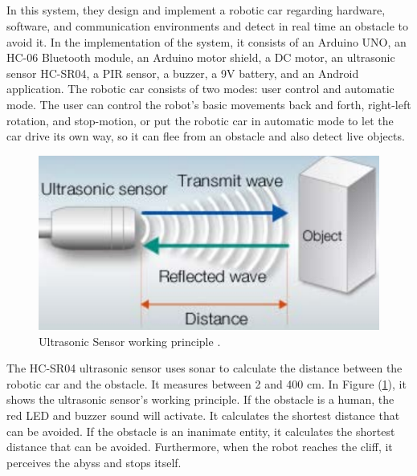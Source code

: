 \documentclass[12pt,a4paper]{report}
\begin{document}
\subsection{\fontsize{12}{12}\selectfont{Remote and Autonomous Controlled Robotic Carbased on Arduino with Real Time Obstacle Detection and Avoidance}}
In this system, they design and implement a robotic car regarding hardware, software, and communication environments and detect in real time an obstacle to avoid it. In the implementation of the system, it consists of an Arduino UNO, an HC-06 Bluetooth module, an Arduino motor shield, a DC motor, an ultrasonic sensor HC-SR04, a PIR sensor, a buzzer, a 9V battery, and an Android application. The robotic car consists of two modes: user control and automatic mode. The user can control the robot's basic movements back and forth, right-left rotation, and stop-motion, or put the robotic car in automatic mode to let the car drive its own way, so it can flee from an obstacle and also detect live objects.
\\
\begin{figure}[H]
    \centering
    \graphicspath{ {./images/} }
    \includegraphics[width=1\textwidth]{Ultrasonic Sensor working principle.png}
    \caption{Ultrasonic Sensor working principle \cite{Robotic}.}
    \label{fig:Ultrasonic Sensor working principle}
    
\end{figure}
The HC-SR04 ultrasonic sensor uses sonar to calculate the distance between the robotic car and the obstacle. It measures between 2 and 400 cm. In Figure (\ref{fig:Ultrasonic Sensor working principle}), it shows the ultrasonic sensor's working principle. If the obstacle is a human, the red LED and buzzer sound will activate. It calculates the shortest distance that can be avoided. If the obstacle is an inanimate entity, it calculates the shortest distance that can be avoided. Furthermore, when the robot reaches the cliff, it perceives the abyss and stops itself\cite{Robotic}. 
\\
\end{document}
